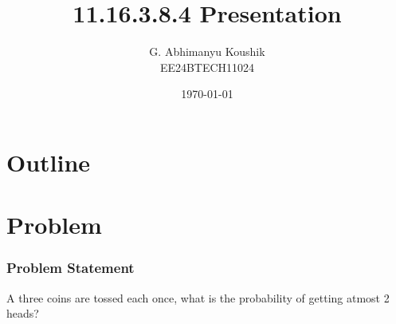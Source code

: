 \documentclass{beamer}
\title{11.16.3.8.4 Presentation}
\author{G. Abhimanyu Koushik \\ EE24BTECH11024}
\date{\today}
\theoremstyle{remark}
\numberwithin{equation}{section}
\begin{document}
\begin{frame}
\titlepage
\end{frame}

\section*{Outline}
\begin{frame}
\tableofcontents
\end{frame}
\section{Problem}
\begin{frame}
\frametitle{Problem Statement}
%
A three coins are tossed each once, what is the probability of getting atmost 2 heads?
%
\end{frame}

\end{document}
